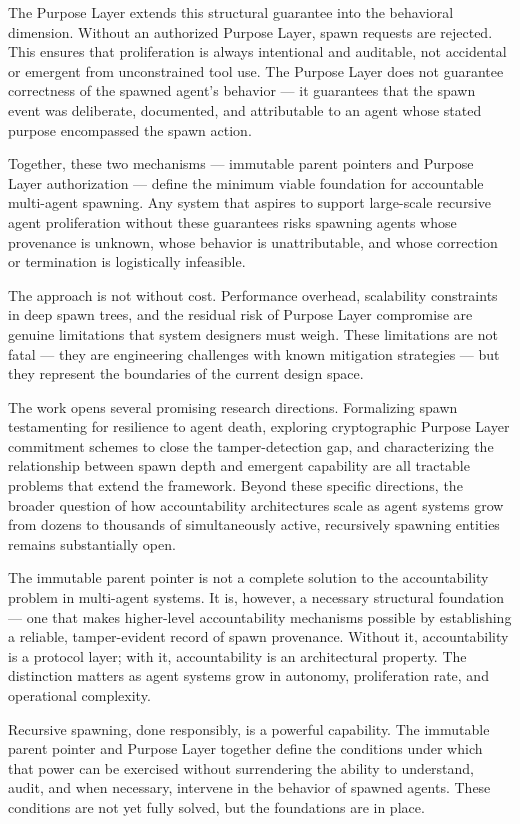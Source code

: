 The Purpose Layer extends this structural guarantee into the behavioral dimension. Without an authorized Purpose Layer, spawn requests are rejected. This ensures that proliferation is always intentional and auditable, not accidental or emergent from unconstrained tool use. The Purpose Layer does not guarantee correctness of the spawned agent's behavior — it guarantees that the spawn event was deliberate, documented, and attributable to an agent whose stated purpose encompassed the spawn action.

Together, these two mechanisms — immutable parent pointers and Purpose Layer authorization — define the minimum viable foundation for accountable multi-agent spawning. Any system that aspires to support large-scale recursive agent proliferation without these guarantees risks spawning agents whose provenance is unknown, whose behavior is unattributable, and whose correction or termination is logistically infeasible.

The approach is not without cost. Performance overhead, scalability constraints in deep spawn trees, and the residual risk of Purpose Layer compromise are genuine limitations that system designers must weigh. These limitations are not fatal — they are engineering challenges with known mitigation strategies — but they represent the boundaries of the current design space.

The work opens several promising research directions. Formalizing spawn testamenting for resilience to agent death, exploring cryptographic Purpose Layer commitment schemes to close the tamper-detection gap, and characterizing the relationship between spawn depth and emergent capability are all tractable problems that extend the framework. Beyond these specific directions, the broader question of how accountability architectures scale as agent systems grow from dozens to thousands of simultaneously active, recursively spawning entities remains substantially open.

The immutable parent pointer is not a complete solution to the accountability problem in multi-agent systems. It is, however, a necessary structural foundation — one that makes higher-level accountability mechanisms possible by establishing a reliable, tamper-evident record of spawn provenance. Without it, accountability is a protocol layer; with it, accountability is an architectural property. The distinction matters as agent systems grow in autonomy, proliferation rate, and operational complexity.

Recursive spawning, done responsibly, is a powerful capability. The immutable parent pointer and Purpose Layer together define the conditions under which that power can be exercised without surrendering the ability to understand, audit, and when necessary, intervene in the behavior of spawned agents. These conditions are not yet fully solved, but the foundations are in place.